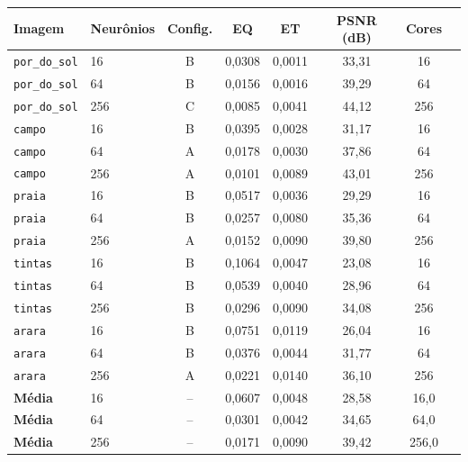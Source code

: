 \begin{tabular}{llcccccc}
\toprule
Imagem & Neurônios & Config. & EQ & ET & PSNR (dB) & Cores \\
\midrule
\texttt{por\_do\_sol} & 16 & B & 0{,}0308 & 0{,}0011 & 33{,}31 & 16 \\
\texttt{por\_do\_sol} & 64 & B & 0{,}0156 & 0{,}0016 & 39{,}29 & 64 \\
\texttt{por\_do\_sol} & 256 & C & 0{,}0085 & 0{,}0041 & 44{,}12 & 256 \\
\midrule
\texttt{campo} & 16 & B & 0{,}0395 & 0{,}0028 & 31{,}17 & 16 \\
\texttt{campo} & 64 & A & 0{,}0178 & 0{,}0030 & 37{,}86 & 64 \\
\texttt{campo} & 256 & A & 0{,}0101 & 0{,}0089 & 43{,}01 & 256 \\
\midrule
\texttt{praia} & 16 & B & 0{,}0517 & 0{,}0036 & 29{,}29 & 16 \\
\texttt{praia} & 64 & B & 0{,}0257 & 0{,}0080 & 35{,}36 & 64 \\
\texttt{praia} & 256 & A & 0{,}0152 & 0{,}0090 & 39{,}80 & 256 \\
\midrule
\texttt{tintas} & 16 & B & 0{,}1064 & 0{,}0047 & 23{,}08 & 16 \\
\texttt{tintas} & 64 & B & 0{,}0539 & 0{,}0040 & 28{,}96 & 64 \\
\texttt{tintas} & 256 & B & 0{,}0296 & 0{,}0090 & 34{,}08 & 256 \\
\midrule
\texttt{arara} & 16 & B & 0{,}0751 & 0{,}0119 & 26{,}04 & 16 \\
\texttt{arara} & 64 & B & 0{,}0376 & 0{,}0044 & 31{,}77 & 64 \\
\texttt{arara} & 256 & A & 0{,}0221 & 0{,}0140 & 36{,}10 & 256 \\
\midrule
\textbf{Média} & 16 & -- & 0{,}0607 & 0{,}0048 & 28{,}58 & 16{,}0 \\
\textbf{Média} & 64 & -- & 0{,}0301 & 0{,}0042 & 34{,}65 & 64{,}0 \\
\textbf{Média} & 256 & -- & 0{,}0171 & 0{,}0090 & 39{,}42 & 256{,}0 \\
\bottomrule
\end{tabular}
